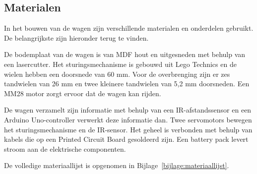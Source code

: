 \subsection{Materialen}
In het bouwen van de wagen zijn verschillende materialen en onderdelen gebruikt. De belangrijkste zijn hieronder terug te vinden.

De bodemplaat van de wagen is van MDF hout en uitgesneden met behulp van een lasercutter. Het sturingsmechanisme is gebouwd uit Lego Technics en de  wielen hebben een doorsnede van 60 mm. Voor de overbrenging zijn er zes tandwielen van 26 mm en twee kleinere tandwielen van 5,2 mm doorsneden.
Een MM28 motor zorgt ervoor dat de wagen kan rijden. 

De wagen verzamelt zijn informatie met behulp van een IR-afstandssensor en een Arduino Uno-controller verwerkt deze informatie dan. Twee servomotors bewegen het sturingsmechanisme en de IR-sensor. Het geheel is verbonden met behulp van kabels die op een Printed Circuit Board gesoldeerd zijn. Een battery pack levert stroom aan de elektrische componenten. 

De volledige materiaallijst is opgenomen in Bijlage~\ref{bijlage:materiaallijst}. 

